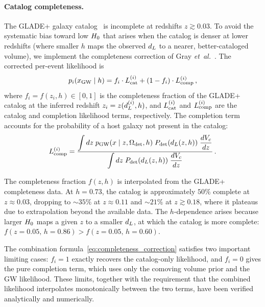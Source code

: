 \paragraph{Catalog completeness.}
The GLADE+ galaxy catalog~\cite{Dalya:2021ewn} is incomplete at redshifts
$z \gtrsim 0.03$. To avoid the systematic bias toward low $H_0$ that
arises when the catalog is denser at lower redshifts (where smaller $h$
maps the observed $d_L$ to a nearer, better-cataloged volume), we
implement the completeness correction of Gray
\emph{et~al.}~\cite{Gray:2019ksv}. The corrected per-event likelihood is
\begin{equation}
  p_i(x_\mathrm{GW} \mid h) =
    f_i \cdot L_\mathrm{cat}^{(i)}
    + (1 - f_i) \cdot L_\mathrm{comp}^{(i)} \,,
  \label{eq:completeness_correction}
\end{equation}
where $f_i = f(z_i, h) \in [0, 1]$ is the completeness fraction of the
GLADE+ catalog at the inferred redshift $z_i = z(d_L^{(i)}, h)$, and
$L_\mathrm{cat}^{(i)}$ and $L_\mathrm{comp}^{(i)}$ are the catalog and completion
likelihood terms, respectively. The completion term accounts for the
probability of a host galaxy not present in the catalog:
\begin{equation}
  L_\mathrm{comp}^{(i)} =
    \frac{\displaystyle\int dz \; p_\mathrm{GW}(x \mid z, \Omega_\mathrm{det}, h)
      \; P_\mathrm{det}(d_L(z,h)) \; \frac{dV_c}{dz}}
    {\displaystyle\int dz \; P_\mathrm{det}(d_L(z,h))
      \; \frac{dV_c}{dz}} \,.
  \label{eq:completion_term}
\end{equation}

The completeness fraction $f(z, h)$ is interpolated from the GLADE+
completeness data. At $h = 0.73$, the catalog is approximately $50\%$
complete at $z \approx 0.03$, dropping to $\sim 35\%$ at
$z \approx 0.11$ and $\sim 21\%$ at $z \gtrsim 0.18$, where it
plateaus due to extrapolation beyond the available data. The $h$-dependence
arises because larger $H_0$ maps a given $z$ to a smaller $d_L$, at which
the catalog is more complete: $f(z = 0.05,\, h = 0.86) > f(z = 0.05,\, h = 0.60)$.

The combination formula~\eqref{eq:completeness_correction} satisfies two
important limiting cases: $f_i = 1$ exactly recovers the catalog-only
likelihood, and $f_i = 0$ gives the pure completion term, which uses only
the comoving volume prior and the GW likelihood. These limits, together
with the requirement that the combined likelihood interpolates
monotonically between the two terms, have been verified analytically and
numerically.


